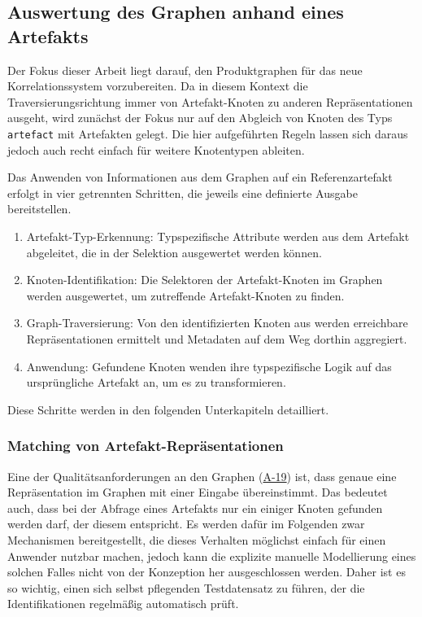 \subsection{Auswertung des Graphen anhand eines Artefakts}\label{subsec:model-apply-to-artifact}

Der Fokus dieser Arbeit liegt darauf, den Produktgraphen für das neue Korrelationssystem vorzubereiten.
Da in diesem Kontext die Traversierungsrichtung immer von Artefakt-Knoten zu anderen Repräsentationen ausgeht, wird zunächst der Fokus nur auf den Abgleich von Knoten des Typs \texttt{artefact} mit Artefakten gelegt.
Die hier aufgeführten Regeln lassen sich daraus jedoch auch recht einfach für weitere Knotentypen ableiten.

Das Anwenden von Informationen aus dem Graphen auf ein Referenzartefakt erfolgt in vier getrennten Schritten, die jeweils eine definierte Ausgabe bereitstellen.

\begin{enumerate}
    \itemsep0em
    \item Artefakt-Typ-Erkennung: Typspezifische Attribute werden aus dem Artefakt abgeleitet, die in der Selektion ausgewertet werden können.
    \item Knoten-Identifikation: Die Selektoren der Artefakt-Knoten im Graphen werden ausgewertet, um zutreffende Artefakt-Knoten zu finden.
    \item Graph-Traversierung: Von den identifizierten Knoten aus werden erreichbare Repräsentationen ermittelt und Metadaten auf dem Weg dorthin aggregiert.
    \item Anwendung: Gefundene Knoten wenden ihre typspezifische Logik auf das ursprüngliche Artefakt an, um es zu transformieren.
\end{enumerate}

Diese Schritte werden in den folgenden Unterkapiteln detailliert.

\subsubsection{Matching von Artefakt-Repräsentationen}\label{subsubsec:model-matching}

Eine der Qualitätsanforderungen an den Graphen (\hyperref[subsec:req-graph-inner-consistency]{A-19}) ist, dass genaue eine Repräsentation im Graphen mit einer Eingabe übereinstimmt.
Das bedeutet auch, dass bei der Abfrage eines Artefakts nur ein einiger Knoten gefunden werden darf, der diesem entspricht.
Es werden dafür im Folgenden zwar Mechanismen bereitgestellt, die dieses Verhalten möglichst einfach für einen Anwender nutzbar machen, jedoch kann die explizite manuelle Modellierung eines solchen Falles nicht von der Konzeption her ausgeschlossen werden.
Daher ist es so wichtig, einen sich selbst pflegenden Testdatensatz zu führen, der die Identifikationen regelmäßig automatisch prüft.


